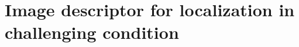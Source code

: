 \documentclass[thesis.tex]{subfiles}
\begin{document}
\acresetall

\graphicspath{{3_side_modality_learning_for_localisation/figures/}}

\chapter[Localization in challenging condition]{Image descriptor for localization in challenging condition}\label{chap:3}









\end{document}
